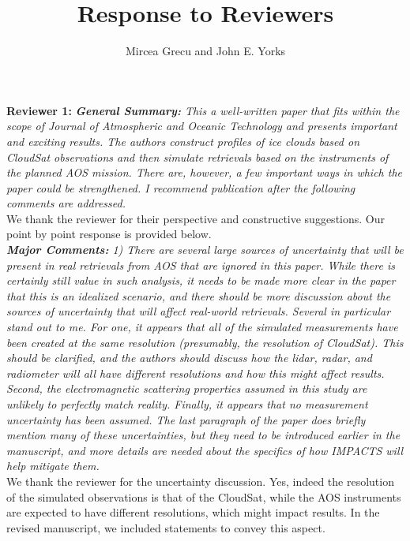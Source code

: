 \documentclass[12pt]{article}
\author{Mircea Grecu and John E. Yorks}
\title{Response to Reviewers}
\date{}
\begin{document}
\maketitle


\noindent \textbf{Reviewer 1:}
\noindent\textit{ \textbf{General Summary:}
This a well-written paper that fits within the scope of Journal of Atmospheric and 
Oceanic Technology and presents important and exciting results. The authors construct
 profiles of ice clouds based on CloudSat observations and then simulate retrievals 
 based on the instruments of the planned AOS mission. There are, however, 
 a few important ways in which the paper could be strengthened. I recommend 
 publication after the following comments are addressed.}\\
\newline
 We thank the reviewer for their perspective and constructive suggestions. Our point by point response is 
 provided below.\\
\newline
\textit{\textbf{Major Comments:} 1) There are several large sources of uncertainty that will be present in real 
retrievals from AOS that are ignored in this paper. While there is certainly still 
value in such analysis, it needs to be made more clear in the paper that this is an 
idealized scenario, and there should be more discussion about the sources of 
uncertainty that will affect real-world retrievals. Several in particular stand 
out to me. For one, it appears that all of the simulated measurements have been 
created at the same resolution (presumably, the resolution of CloudSat). This
should be clarified, and the authors should discuss how the lidar, radar, and 
radiometer will all have different resolutions and how this might affect results. 
Second, the electromagnetic scattering properties assumed in this study are 
unlikely to perfectly match reality. Finally, it appears that no measurement 
uncertainty has been assumed. The last paragraph of the paper does briefly mention 
many of these uncertainties, but they need to be introduced earlier in the 
manuscript, and more details are needed about the specifics of how IMPACTS
will help mitigate them.}\\
\newline
We thank the reviewer for the uncertainty discussion. Yes, indeed the resolution of the simulated 
observations is that of the CloudSat, while the AOS instruments are expected to have different resolutions,
which might impact results. In the revised manuscript, we included statements to convey this aspect.
\end{document}
